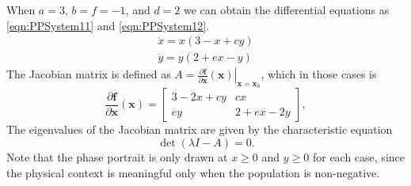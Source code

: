 When $a=3$, $b=f=-1$, and $d=2$ we can obtain the differential equations as  \eqref{eqn:PPSystem11} and \eqref{eqn:PPSystem12}.
\begin{subequations}\label{eqn:PPSystem1}
\begin{align}
    \dot{x} = x(3-x+cy) \label{eqn:PPSystem11} \\
    \dot{y} = y(2+ex-y) \label{eqn:PPSystem12}
\end{align}
\end{subequations}
The Jacobian matrix is defined as $A = \left. \frac{\partial\textbf{f}}{\partial \textbf{x}}(\textbf{x}) \right|_{\textbf{x}=\textbf{x}_0}$, which in those cases is
\begin{equation*}
    \frac{\partial\textbf{f}}{\partial \textbf{x}}(\textbf{x}) =
    \left[\begin{array}{cc}
    3-2x+cy & cx \\
    ey & 2+ex-2y
    \end{array}\right],
\end{equation*}
The eigenvalues of the Jacobian matrix are given by the characteristic equation
\begin{equation*}
    \det(\lambda I - A) = 0.
\end{equation*}
Note that the phase portrait is only drawn at $x\geq0$ and $y\geq0$ for each case, since the physical context is meaningful only when the population is non-negative.
